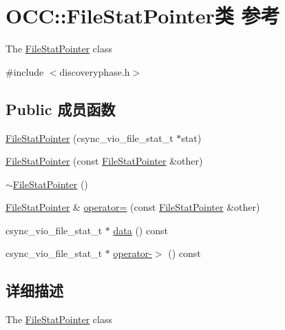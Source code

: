 \hypertarget{class_o_c_c_1_1_file_stat_pointer}{}\section{O\+CC\+:\+:File\+Stat\+Pointer类 参考}
\label{class_o_c_c_1_1_file_stat_pointer}


The \hyperlink{class_o_c_c_1_1_file_stat_pointer}{File\+Stat\+Pointer} class  




{\ttfamily \#include $<$discoveryphase.\+h$>$}

\subsection*{Public 成员函数}
\begin{DoxyCompactItemize}
\item 
\hyperlink{class_o_c_c_1_1_file_stat_pointer_abcd604de0991873f6a6ee99ee25217e0}{File\+Stat\+Pointer} (csync\+\_\+vio\+\_\+file\+\_\+stat\+\_\+t $\ast$stat)
\item 
\hyperlink{class_o_c_c_1_1_file_stat_pointer_a944a29f8508675646dfedfe686352ab1}{File\+Stat\+Pointer} (const \hyperlink{class_o_c_c_1_1_file_stat_pointer}{File\+Stat\+Pointer} \&other)
\item 
\hyperlink{class_o_c_c_1_1_file_stat_pointer_afc55a0f9be9be247741358841eaa3bb2}{$\sim$\+File\+Stat\+Pointer} ()
\item 
\hyperlink{class_o_c_c_1_1_file_stat_pointer}{File\+Stat\+Pointer} \& \hyperlink{class_o_c_c_1_1_file_stat_pointer_a545ea796746e369b08c4810f6905cb23}{operator=} (const \hyperlink{class_o_c_c_1_1_file_stat_pointer}{File\+Stat\+Pointer} \&other)
\item 
csync\+\_\+vio\+\_\+file\+\_\+stat\+\_\+t $\ast$ \hyperlink{class_o_c_c_1_1_file_stat_pointer_a8c275483ed93e591133f968779481e02}{data} () const
\item 
csync\+\_\+vio\+\_\+file\+\_\+stat\+\_\+t $\ast$ \hyperlink{class_o_c_c_1_1_file_stat_pointer_af6f5ff38c084c2a6d314c57e94bb9c3a}{operator-\/$>$} () const
\end{DoxyCompactItemize}


\subsection{详细描述}
The \hyperlink{class_o_c_c_1_1_file_stat_pointer}{File\+Stat\+Pointer} class 


